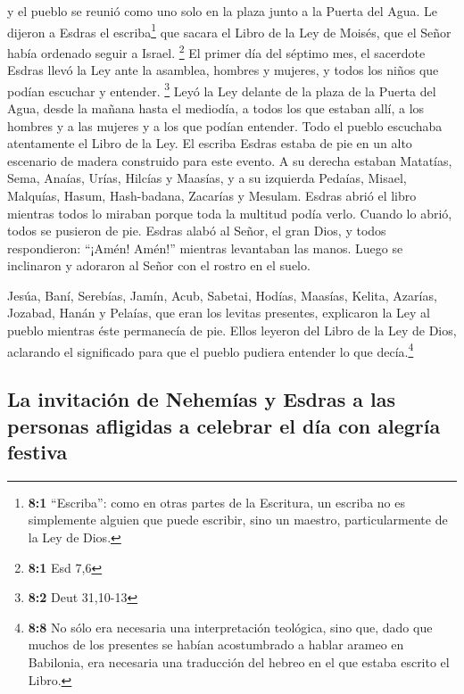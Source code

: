  y el pueblo se reunió como uno solo en la plaza junto a
la Puerta del Agua. Le dijeron a Esdras el escriba\footnote{\textbf{8:1}
  ``Escriba'': como en otras partes de la Escritura, un escriba no es
  simplemente alguien que puede escribir, sino un maestro,
  particularmente de la Ley de Dios.} que sacara el Libro de la Ley de
Moisés, que el Señor había ordenado seguir a Israel. \footnote{\textbf{8:1}
  Esd 7,6}  El primer día del séptimo mes, el sacerdote
Esdras llevó la Ley ante la asamblea, hombres y mujeres, y todos los
niños que podían escuchar y entender. \footnote{\textbf{8:2} Deut
  31,10-13}  Leyó la Ley delante de la plaza de la Puerta
del Agua, desde la mañana hasta el mediodía, a todos los que estaban
allí, a los hombres y a las mujeres y a los que podían entender. Todo el
pueblo escuchaba atentamente el Libro de la Ley.  El
escriba Esdras estaba de pie en un alto escenario de madera construido
para este evento. A su derecha estaban Matatías, Sema, Anaías, Urías,
Hilcías y Maasías, y a su izquierda Pedaías, Misael, Malquías, Hasum,
Hash-badana, Zacarías y Mesulam.  Esdras abrió el libro
mientras todos lo miraban porque toda la multitud podía verlo. Cuando lo
abrió, todos se pusieron de pie.  Esdras alabó al Señor,
el gran Dios, y todos respondieron: ``¡Amén! Amén!'' mientras levantaban
las manos. Luego se inclinaron y adoraron al Señor con el rostro en el
suelo.

 Jesúa, Baní, Serebías, Jamín, Acub, Sabetai, Hodías,
Maasías, Kelita, Azarías, Jozabad, Hanán y Pelaías, que eran los levitas
presentes, explicaron la Ley al pueblo mientras éste permanecía de pie.
 Ellos leyeron del Libro de la Ley de Dios, aclarando el
significado para que el pueblo pudiera entender lo que decía.\footnote{\textbf{8:8}
  No sólo era necesaria una interpretación teológica, sino que, dado que
  muchos de los presentes se habían acostumbrado a hablar arameo en
  Babilonia, era necesaria una traducción del hebreo en el que estaba
  escrito el Libro.}

\hypertarget{la-invitaciuxf3n-de-nehemuxedas-y-esdras-a-las-personas-afligidas-a-celebrar-el-duxeda-con-alegruxeda-festiva}{%
\subsection{La invitación de Nehemías y Esdras a las personas afligidas
a celebrar el día con alegría
festiva}\label{la-invitaciuxf3n-de-nehemuxedas-y-esdras-a-las-personas-afligidas-a-celebrar-el-duxeda-con-alegruxeda-festiva}}

